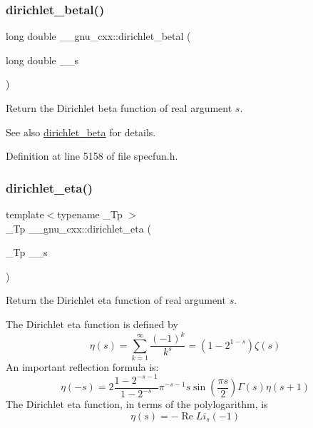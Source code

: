 \subsubsection{\texorpdfstring{dirichlet\+\_\+betal()}{dirichlet\_betal()}}
{\footnotesize\ttfamily long double \+\_\+\+\_\+gnu\+\_\+cxx\+::dirichlet\+\_\+betal (\begin{DoxyParamCaption}\item[{long double}]{\+\_\+\+\_\+s }\end{DoxyParamCaption})\hspace{0.3cm}{\ttfamily [inline]}}

Return the Dirichlet beta function of real argument $ s $.

\begin{DoxySeeAlso}{See also}
\hyperlink{group__gnu__math__spec__func_ga87466a2d429a2815d794acc21c882b08}{dirichlet\+\_\+beta} for details. 
\end{DoxySeeAlso}


Definition at line 5158 of file specfun.\+h.

\mbox{\label{group__gnu__math__spec__func_gae46e26e4107675d285c79a2d6202e6c7}} 
\subsubsection{\texorpdfstring{dirichlet\+\_\+eta()}{dirichlet\_eta()}}
{\footnotesize\ttfamily template$<$typename \+\_\+\+Tp $>$ \\
\+\_\+\+Tp \+\_\+\+\_\+gnu\+\_\+cxx\+::dirichlet\+\_\+eta (\begin{DoxyParamCaption}\item[{\+\_\+\+Tp}]{\+\_\+\+\_\+s }\end{DoxyParamCaption})\hspace{0.3cm}{\ttfamily [inline]}}

Return the Dirichlet eta function of real argument $ s $.

The Dirichlet eta function is defined by \[ \eta(s) = \sum_{k=1}^\infty \frac{(-1)^k}{k^s} = \left( 1 - 2^{1-s} \right) \zeta(s) \] An important reflection formula is\+: \[ \eta(-s) = 2 \frac{1-2^{-s-1}}{1-2^{-s}} \pi^{-s-1} s \sin(\frac{\pi s}{2}) \Gamma(s) \eta(s+1) \] The Dirichlet eta function, in terms of the polylogarithm, is \[ \renewcommand\Re{\operatorname{Re}} \renewcommand\Im{\operatorname{Im}} \eta(s) = -\Re{Li_s(-1)} \]


